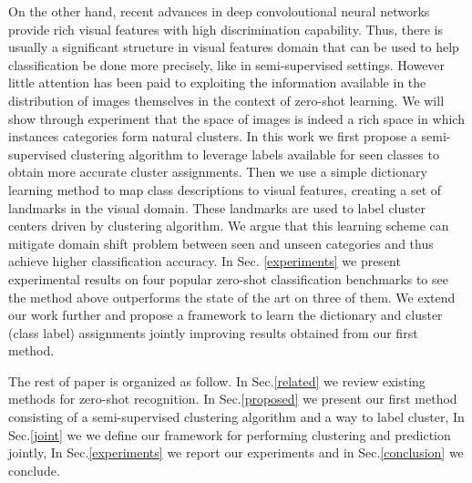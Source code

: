  On the other hand, recent advances in deep convoloutional neural networks provide rich visual features with high discrimination capability.
 Thus, there is usually a significant structure in visual features domain
that can be used to help classification be done more precisely, like in semi-supervised settings. However little attention
has been paid to exploiting the information available in the distribution of images themselves in the context of zero-shot learning. We will show through experiment that
the space of images is indeed a rich space in which instances categories form natural clusters.
 In this work
 we first propose a
  semi-supervised clustering algorithm to leverage labels available for seen classes to obtain more accurate cluster assignments.
 Then we use a simple dictionary learning method to map class descriptions to visual features, creating a set of landmarks in the visual domain.
 These landmarks are used to label cluster centers driven by clustering algorithm.
  We argue that this learning scheme can mitigate domain shift problem \cite{eccv14} between seen and unseen categories and thus achieve higher classification accuracy.
In Sec. \ref{experiments} we present experimental results on four popular zero-shot classification benchmarks to see
the method above outperforms the state of the art on three of them.
 We extend our work further and propose a framework to learn the dictionary and cluster (class label) assignments jointly
 improving results obtained from our first method.

The rest of paper is organized as follow. In Sec.\ref{related} we review existing methods for zero-shot recognition.
In Sec.\ref{proposed} we present our first method consisting of a semi-supervised clustering algorithm and a way to label cluster, In Sec.\ref{joint} we
we define our framework for performing clustering and prediction jointly, In Sec.\ref{experiments} we report our experiments and in Sec.\ref{conclusion}
we conclude.
